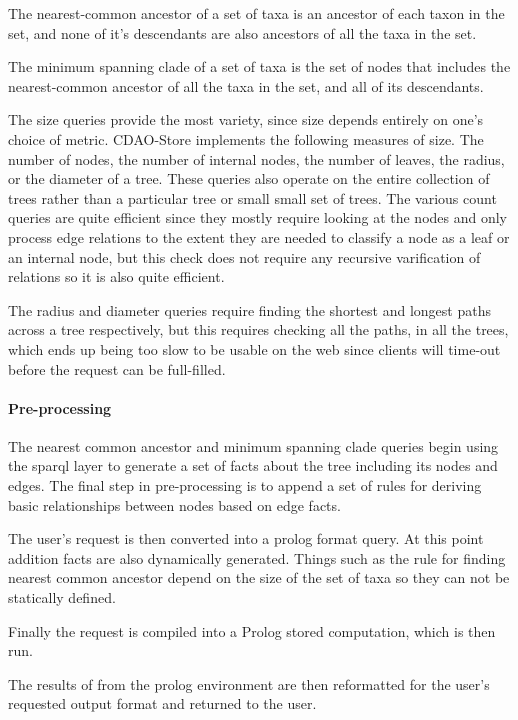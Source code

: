 \documentclass[10pt]{article}
\begin{document}
      The nearest-common ancestor of a set of taxa is an ancestor of each taxon in the set, and none of it's descendants are also
      ancestors of all the taxa in the set. 
      
       The minimum spanning clade of a set of taxa is the set of nodes that includes the nearest-common ancestor of all the taxa
       in the set, and all of its descendants.

       The size queries provide the most variety, since size depends entirely on one's choice of metric. CDAO-Store implements the
       following measures of size. The number of nodes, the number of internal nodes, the number of leaves, the radius, or the diameter
       of a tree. These queries also operate on the entire collection of trees rather than a particular tree or small small set of trees.
       The various count queries are quite efficient since they mostly require looking at the nodes and only process edge relations to the
       extent they are needed to classify a node as a leaf or an internal node, but this check does not require any recursive varification
       of relations so it is also quite efficient.

       The radius and diameter queries require finding the shortest and longest paths across a tree respectively, but this requires checking all
       the paths, in all the trees, which ends up being too slow to be usable on the web since clients will time-out before the request can
       be full-filled. 

       \paragraph{Pre-processing}
       The nearest common ancestor and minimum spanning clade queries begin using the sparql layer to generate a set of facts about the tree
       including its nodes and edges. The final step in pre-processing is to append a set of rules for deriving basic relationships between nodes
       based on edge facts.

       The user's request is then converted into a prolog format query. At this point addition facts are also dynamically generated. Things such
       as the rule for finding nearest common ancestor depend on the size of the set of taxa so they can not be statically defined. 
       
       Finally the request is compiled into a Prolog stored computation, which is then run. 

       The results of from the prolog environment are then reformatted for the user's requested output format and returned to the user.
\end{document}
